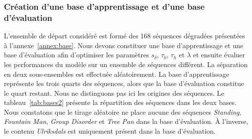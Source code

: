 \subsubsection{Création d'une base d'apprentissage et d'une base d'évaluation}
L'ensemble de départ considéré est formé des 168 séquences dégradées présentées à l'annexe~\ref{annex:base}. Nous devons constituer une base d'apprentissage et une base d'évaluation afin d'optimiser les paramètres $s_\delta$, $\tau_b$, $\tau_h$ et $\lambda$ et ensuite évaluer les performances du modèle sur un ensemble de séquences différent. La séparation en deux sous-ensembles est effectuée aléatoirement. La base d'apprentissage représente les trois quarts des séquences, alors que la base d'évaluation constitue le quart restant. Nous ne distinguons pas ici les origines des séquences. Le tableau~\ref{tab:bases2} présente la répartition des séquences dans les deux bases. Nous constatons que le tirage aléatoire ne place aucune des séquences \emph{Standing}, \emph{Fountain Man}, \emph{Group Disorder} et \emph{Tree Pan} dans la base d'évaluation. À l'inverse, le contenu \emph{Ulriksdals} est uniquement présent dans la base d'évaluation.

